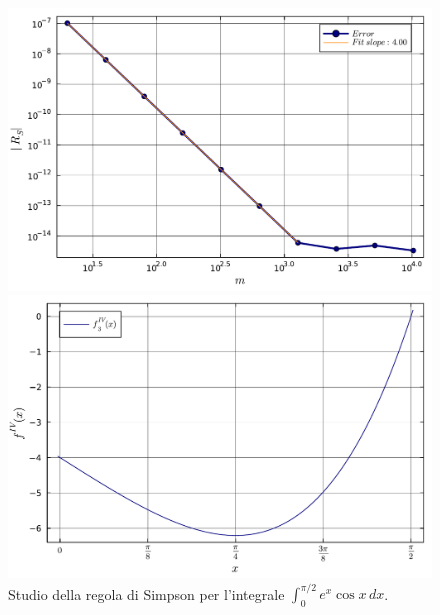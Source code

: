 \documentclass[letterpaper, 12pt]{article}
\numberwithin{equation}{section}    %
\begin{document}
\begin{figure}[!ht]
    \centering
    \begin{minipage}[b]{0.47\textwidth}
        \includegraphics[width=\textwidth]{5143.pdf}
    \end{minipage}
    \hspace{0.5cm}
    \begin{minipage}[b]{0.47\textwidth}
        \includegraphics[width=\textwidth]{5143_2.pdf}
    \end{minipage}
    \caption{Studio della regola di Simpson per l'integrale $\int_0^{\pi/2}e^x \cos x\, dx$.}
    \label{fig:es5_1_4_3}
\end{figure}
\end{document}
